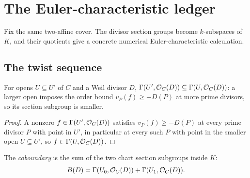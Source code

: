 \section{The Euler-characteristic ledger}
\label{mk-sec:RiemannRoch_Adelic_chi}

Fix the same two-affine cover.  The divisor section groups become
\(k\)-subspaces of \(K\), and their quotients give a concrete numerical
Euler-characteristic calculation.

\subsection{The twist sequence}

\begin{lemma}
  \label{mk-lem:adelic_sectionOfDivisor_antitone_open}
  \leanok
  For opens \(U \subseteq U'\) of \(C\) and a Weil divisor \(D\),
  \(\Gamma(U', \mathcal{O}_{C}(D)) \subseteq \Gamma(U, \mathcal{O}_{C}(D))\): a
  larger open imposes the order bound \(v_P(f) \ge -D(P)\) at more
  prime divisors, so its section subgroup is smaller.
\end{lemma}
\begin{proof}
  \leanok
  A nonzero \(f \in \Gamma(U', \mathcal{O}_{C}(D))\) satisfies
  \(v_P(f) \ge -D(P)\) at every prime divisor \(P\) with point in
  \(U'\), in particular at every such \(P\) with point in the smaller
  open \(U \subseteq U'\), so \(f \in \Gamma(U, \mathcal{O}_{C}(D))\).
\end{proof}

\begin{definition}
  \label{mk-def:adelic_coboundary}
  \leanok
  The \emph{coboundary} is the sum of the two chart section subgroups
  inside \(K\):
  \[
    B(D)=\Gamma(U_0,\mathcal{O}_{C}(D))+\Gamma(U_1,\mathcal{O}_{C}(D)).
  \]
\end{definition}


